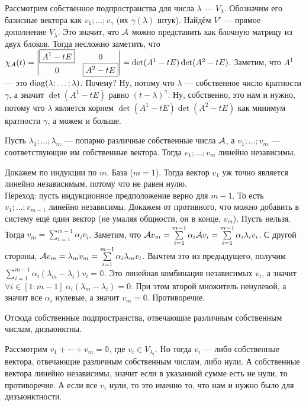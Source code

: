 \documentclass{article}
\begin{document}
\begin{itemize}
\begin{Proof}
            Рассмотрим собственное подпространства для числа $\lambda$ --- $V_\lambda$. Обозначим его базисные вектора как $v_1;\ldots;v_\gamma$ (их $\gamma(\lambda)$ штук). Найдём $V'$ --- прямое дополнение $V_\lambda$. Это значит, что ${\mathcal{A}}$ можно представить как блочную матрицу из двух блоков. Тогда несложно заметить, что $\chi_{\mathcal{A}}(t)=\left|\begin{matrix}
                \boxed{A^1-tE} & 0\\
                0 & \boxed{A^2-tE}
            \end{matrix}\right|=\det(A^1-tE)\det(A^2-tE)$. Заметим, что $A^1$ --- это $\operatorname{diag}(\lambda;\ldots;\lambda)$. Почему? Ну, потому что $\lambda$ --- собственное число кратности $\gamma$, а значит $\det(A^1-tE)$ равно $(t-\lambda)^\gamma$. Ну, собственно, это нам и нужно, потому что $\lambda$ является корнем $\det(A^1-tE)\det(A^2-tE)$ как минимум кратности $\gamma$, а можем и больше.
        \end{Proof}
        \thm Пусть $\lambda_1;\ldots;\lambda_m$ --- попарно различные собственные числа ${\mathcal{A}}$, а $v_1;\ldots;v_m$ --- соответствующие им собственные вектора. Тогда $v_1;\ldots;v_m$ линейно независимы.
        \begin{Proof}
            Докажем по индукции по $m$. База ($m=1$). Тогда вектор $v_1$ уж точно является линейно независимым, потому что не равен нулю.\\
            Переход: пусть индукционное предположение верно для $m-1$. То есть $v_1;\ldots;v_{m-1}$ линейно независимы. Докажем от противного, что можно добавить в систему ещё один вектор (не умаляя общности, он в конце, $v_m$). Пусть нельзя. Тогда $v_m=\sum\limits_{i=1}^{m-1}\alpha_iv_i$. Заметим, что ${\mathcal{A}} v_m=\sum\limits_{i=1}^{m-1}\alpha_i{\mathcal{A}} v_i=\sum\limits_{i=1}^{m-1}\alpha_i\lambda_iv_i$. С другой стороны, ${\mathcal{A}} v_m=\lambda_mv_m=\sum\limits_{i=1}^{m-1}\alpha_i\lambda_mv_i$. Вычтем это из предыдущего, получим $\sum\limits_{i=1}^{m-1}\alpha_i(\lambda_m-\lambda_i)v_i=\mathbb0$. Это линейная комбинация независимых $v_i$, а значит $\forall i\in[1:m-1]~\alpha_i(\lambda_m-\lambda_i)=0$. При этом второй множитель ненулевой, а значит все $\alpha_i$ нулевые, а значит $v_m=\mathbb0$. Противоречие.
        \end{Proof}
        \thm Отсюда собственные подпространства, отвечающие различным собственным числам, дизъюнктны.
        \begin{Proof}
            Рассмотрим $v_1+\cdots+v_m=\mathbb0$, где $v_i\in V_{\lambda_i}$. Но тогда $v_i$ --- либо собственные вектора, отвечающие различным собственным числам, либо нули. А собственные вектора линейно независимы, значит если в указанной сумме есть не нули, то противоречие. А если все $v_i$ нули, то это именно то, что нам и нужно было для дизъюнктности.

\end{Proof}
\end{itemize}
\end{document}
